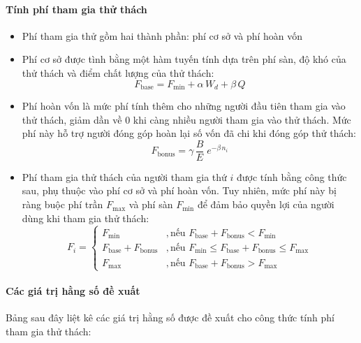\paragraph{Tính phí tham gia thử thách}
\begin{itemize}
  \item Phí tham gia thử gồm hai thành phần: phí cơ sở và phí hoàn vốn
  \item Phí cơ sở được tình bằng một hàm tuyến tính dựa trên phí sàn, độ khó của thử thách và điểm chất lượng của thử thách:
        \[F_{\text{base}}= F_{\text{min}}+ \alpha\,W_d + \beta\,Q\]
  \item Phí hoàn vốn là mức phí tính thêm cho những người đầu tiên tham gia vào thử thách, giảm dần về 0 khi càng nhiều người tham gia vào thử thách. Mức phí này hỗ trợ người đóng góp hoàn lại số vốn đã chi khi đóng góp thử thách:
        \[F_{\text{bonus}}= \gamma\,\frac{B}E\;e^{-\beta\,n_i}\]
  \item Phí tham gia thử thách của người tham gia thứ $i$ được tính bằng công thức sau, phụ thuộc vào phí cơ sở và phí hoàn vốn. Tuy nhiên, mức phí này bị ràng buộc phí trần $F_{\max}$ và phí sàn $F_{\min}$ để đảm bảo quyền lợi của người dùng khi tham gia thử thách:
        \[F_{i} =
          \begin{cases}
            F_{\text{min}}                     & , \text{nếu } F_{\text{base}} + F_{\text{bonus}} < F_{\text{min}}                \\[6pt]
            F_{\text{base}} + F_{\text{bonus}} & , \text{nếu } F_{\text{min}} \le F_{\text{base}} + F_{\text{bonus}} \le F_{\text{max}} \\[6pt]
            F_{\text{max}}                     & , \text{nếu } F_{\text{base}} + F_{\text{bonus}} > F_{\text{max}}
          \end{cases}
        \]
\end{itemize}

\paragraph{Các giá trị hằng số đề xuất}

Bảng sau đây liệt kê các giá trị hằng số được đề xuất cho công thức tính phí tham gia thử thách:

